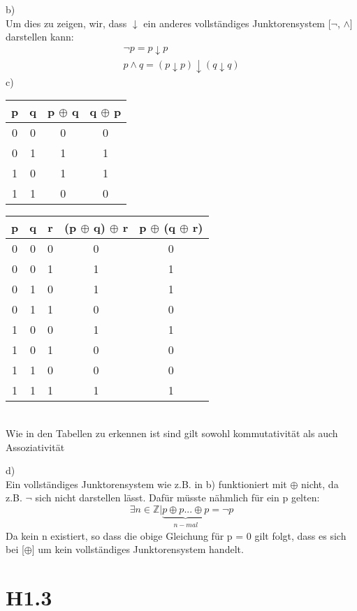 \documentclass{article}
\begin{document}
b) \\ 
Um dies zu zeigen, wir, dass $\downarrow$ ein anderes vollständiges 
Junktorensystem [$\neg$, $\wedge$] darstellen kann: 
\begin{align*}
   \neg p = p \downarrow p \\
   p \wedge q = (p \downarrow p) \downarrow (q \downarrow q)
\end{align*}
c) \\ 
\begin{tabular}[h]{c|c|c|c}
    p & q & p $\oplus$ q & q $\oplus$ p \\ \hline
    0 & 0 & 0 & 0 \\ 
    0 & 1 & 1 & 1 \\ 
    1 & 0 & 1 & 1 \\ 
    1 & 1 & 0 & 0 \\
\end{tabular}
\quad
\begin{tabular}[h]{c|c|c|c|c}
    p & q & r & (p $\oplus$ q) $\oplus$ r & p $\oplus$ (q $\oplus$ r) \\ \hline
    0 & 0 & 0 & 0 & 0 \\
    0 & 0 & 1 & 1 & 1 \\
    0 & 1 & 0 & 1 & 1 \\ 
    0 & 1 & 1 & 0 & 0 \\ 
    1 & 0 & 0 & 1 & 1 \\ 
    1 & 0 & 1 & 0 & 0 \\ 
    1 & 1 & 0 & 0 & 0 \\ 
    1 & 1 & 1 & 1 & 1 \\
\end{tabular}
\\
Wie in den Tabellen zu erkennen ist sind gilt sowohl kommutativität 
als auch Assoziativität 

d) \\
Ein vollständiges Junktorensystem wie z.B. in b) funktioniert mit $\oplus$
nicht, da z.B. $\neg$ sich nicht darstellen lässt.
Dafür müsste nähmlich für ein p gelten:
\[
    \exists n \in \mathds{Z} | \underbrace{p \oplus p ... \oplus p}_{\substack{n - mal}} = \neg p
\]
Da kein n existiert, so dass die obige Gleichung für p = 0 gilt folgt,
dass es sich bei [$\oplus$] um kein vollständiges Junktorensystem handelt.

\section{H1.3}
\end{document}
